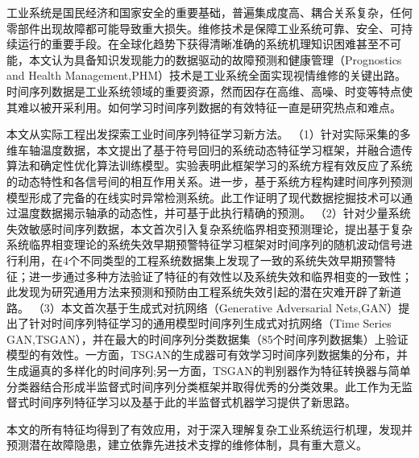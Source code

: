 \begin{cabstract}
  
   工业系统是国民经济和国家安全的重要基础，普遍集成度高、耦合关系复杂，任何零部件出现故障都可能导致重大损失。维修技术是保障工业系统可靠、安全、可持续运行的重要手段。在全球化趋势下获得清晰准确的系统机理知识困难甚至不可能，本文认为具备知识发现能力的数据驱动的故障预测和健康管理（Prognostics and Health Management,PHM）技术是工业系统全面实现视情维修的关键出路。时间序列数据是工业系统领域的重要资源，然而因存在高维、高噪、时变等特点使其难以被开采利用。如何学习时间序列数据的有效特征一直是研究热点和难点。

  本文从实际工程出发探索工业时间序列特征学习新方法。
  （1）针对实际采集的多维车轴温度数据，本文提出了基于符号回归的系统动态特征学习框架，并融合遗传算法和确定性优化算法训练模型。实验表明此框架学习的系统方程有效反应了系统的动态特性和各信号间的相互作用关系。进一步，基于系统方程构建时间序列预测模型形成了完备的在线实时异常检测系统。此工作证明了现代数据挖掘技术可以通过温度数据揭示轴承的动态性，并可基于此执行精确的预测。
  （2）针对少量系统失效敏感时间序列数据，本文首次引入复杂系统临界相变预测理论，提出基于复杂系统临界相变理论的系统失效早期预警特征学习框架对时间序列的随机波动信号进行利用，在4个不同类型的工程系统数据集上发现了一致的系统失效早期预警特征；进一步通过多种方法验证了特征的有效性以及系统失效和临界相变的一致性；此发现为研究通用方法来预测和预防由工程系统失效引起的潜在灾难开辟了新道路。
  （3）本文首次基于生成式对抗网络（Generative Adversarial Nets,GAN）提出了针对时间序列特征学习的通用模型时间序列生成式对抗网络（Time Series GAN,TSGAN），并在最大的时间序列分类数据集（85个时间序列数据集）上验证模型的有效性。一方面，TSGAN的生成器可有效学习时间序列数据集的分布，并生成逼真的多样化的时间序列;另一方面，TSGAN的判别器作为特征转换器与简单分类器结合形成半监督式时间序列分类框架并取得优秀的分类效果。此工作为无监督式时间序列特征学习以及基于此的半监督式机器学习提供了新思路。 

  本文的所有特征均得到了有效应用，对于深入理解复杂工业系统运行机理，发现并预测潜在故障隐患，建立依靠先进技术支撑的维修体制，具有重大意义。



\end{cabstract}

